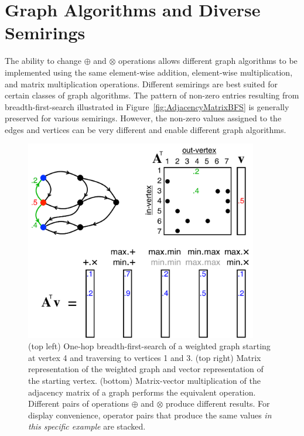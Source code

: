 \section{Graph Algorithms and Diverse Semirings}

   The ability to change $\oplus$ and $\otimes$ operations allows different graph algorithms to be implemented using the same element-wise addition, element-wise multiplication, and matrix multiplication operations.  Different semirings are best suited for certain classes of graph algorithms.  The  pattern of non-zero entries resulting from breadth-first-search  illustrated in Figure~\ref{fig:AdjacencyMatrixBFS} is generally preserved for various semirings.  However, the non-zero values assigned to the edges and vertices can be very different and enable different graph algorithms.
   
   \begin{figure}[!htb]
  \centering
    \includegraphics[width=4in]{figures/AdjacencyMatrixSemiring1hop.pdf}
      \caption{(top left) One-hop breadth-first-search of a weighted graph starting at vertex 4 and traversing to vertices 1 and 3.  (top right) Matrix representation of the weighted graph and vector representation of the starting vertex.  (bottom) Matrix-vector multiplication of the adjacency matrix of a graph performs the equivalent operation.  Different pairs of operations $\oplus$ and $\otimes$ produce different results. For display convenience, operator pairs that produce the same values \emph{in this specific example} are stacked.}
      \label{fig:AdjacencyMatrixSemiring1hop}
\end{figure}

